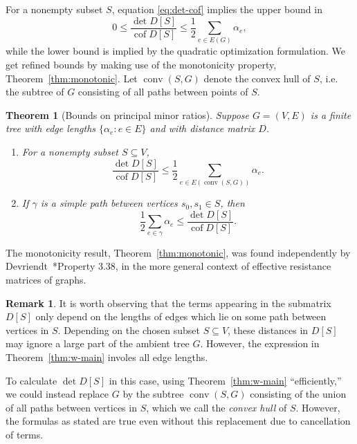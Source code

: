\documentclass[12pt]{amsart}
\newtheorem{thm}{Theorem}[section]
\theoremstyle{definition}
\newtheorem*{rmk*}{Remark}
\newcommand{\Da}{{D}}
\DeclareMathOperator{\cof}{cof}
\DeclareMathOperator{\conv}{conv}
\begin{document}
For a nonempty subset $S$, equation \eqref{eq:det-cof} implies the upper bound in
\begin{equation}
	0 \leq \frac{\det D[S]}{\cof D[S]} \leq \frac12 \sum_{e \in E(G)} \alpha_e ,
\end{equation}
while the lower bound is implied by the quadratic optimization formulation.
We get refined bounds by making use of the monotonicity property, Theorem~\ref{thm:monotonic}. Let $\conv(S,G)$ denote the convex hull of $S$, i.e. the subtree of $G$ consisting of all paths between points of $S$.
 
\begin{thm}[Bounds on principal minor ratios]
\label{thm:det-cof-bounds}
Suppose $G = (V,E)$ is a finite tree with edge lengths $\{\alpha_e \colon e \in E\}$ and with distance matrix $\Da$.
\begin{enumerate}[label=(\alph*)]
\item
For a nonempty subset $S \subseteq V$,
\begin{equation*}
	\frac{\det \Da[S]}{\cof \Da[S]} \leq \frac12 \sum_{e \in E(\conv(S, G))} \alpha_e .
\end{equation*}
\item 
If $\gamma$ is a simple path between vertices $s_0, s_1 \in S$, then
\begin{equation*}
	\frac12 \sum_{e \in \gamma} \alpha_e \leq \frac{\det \Da[S]}{\cof \Da[S]}.
\end{equation*}
\end{enumerate}
\end{thm}

The monotonicity result, Theorem~\ref{thm:monotonic}, was found independently by
Devriendt~\cite{devriendt-thesis}*{Property 3.38},
in the more general context of effective resistance matrices of graphs.


\begin{rmk*}
	It is worth observing that the terms appearing in the submatrix $D[S]$ only depend on the lengths of edges which lie on some path between vertices in $S$.
	Depending on the chosen subset $S \subseteq V$, these distances in $D[S]$ may ignore a large part of the ambient tree $G$.
	However, the expression in Theorem~\ref{thm:w-main} involes all edge lengths.

	To calculate $\det D[S]$ in this case, using Theorem~\ref{thm:w-main} ``efficiently,'' we could instead replace $G$ by the subtree  $\conv(S,G)$ consisting of the union of all paths between vertices in $S$,
	which we call the {\em convex hull} of $S$.
	However, the formulas as stated are true even without this replacement due to cancellation of terms.
\end{rmk*}
	
\end{document}

